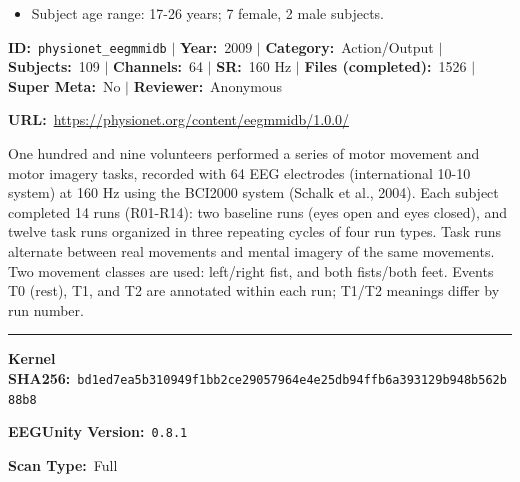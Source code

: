 {\begin{tcolorbox}
\begin{itemize}[leftmargin=1.4em,noitemsep,topsep=2pt]
\item{\footnotesize Subject age range: 17-26 years; 7 female, 2 male subjects.}
\end{itemize}
\end{tcolorbox}
\vspace{3pt}
\noindent\begin{tcolorbox}[breakable,enhanced,colback=white,colframe=gray!55,boxrule=0.9pt,arc=4pt,left=6pt,right=6pt,top=4pt,bottom=4pt,title={\small\bfseries EEG Motor Movement/Imagery Database\hfill \colorbox{gray!20}{\scriptsize\sffamily\bfseries Completed}},coltitle=black,colbacktitle=gray!12,titlerule=0.5pt]
{\footnotesize \textbf{ID:}~\texttt{physionet\_eegmmidb} $\mid$ \textbf{Year:}~2009 $\mid$ \textbf{Category:}~Action/Output $\mid$ \textbf{Subjects:}~109 $\mid$ \textbf{Channels:}~64 $\mid$ \textbf{SR:}~160 Hz $\mid$ \textbf{Files (completed):}~1526 $\mid$ \textbf{Super Meta:}~No $\mid$ \textbf{Reviewer:}~Anonymous}
\par{\footnotesize\textbf{URL:}~\url{https://physionet.org/content/eegmmidb/1.0.0/}}
\tcbline
{}\par\smallskip
{\footnotesize One hundred and nine volunteers performed a series of motor movement and motor imagery tasks, recorded with 64 EEG electrodes (international 10-10 system) at 160 Hz using the BCI2000 system (Schalk et al., 2004). Each subject completed 14 runs (R01-R14): two baseline runs (eyes open and eyes closed), and twelve task runs organized in three repeating cycles of four run types. Task runs alternate between real movements and mental imagery of the same movements. Two movement classes are used: left/right fist, and both fists/both feet. Events T0 (rest), T1, and T2 are annotated within each run; T1/T2 meanings differ by run number.}
\noindent\rule{\linewidth}{0.4pt}\par\nopagebreak
{}\par\smallskip
{\scriptsize
\noindent\textbf{Kernel SHA256:}~\texttt{bd1ed7ea5b310949f1bb2ce29057964e4e25db94ffb6a393129b948b562b88b8}\par\smallskip
\noindent\textbf{EEGUnity Version:}~\texttt{0.8.1}\par\smallskip
\noindent\textbf{Scan Type:}~Full\par\smallskip
}
\smallskip{}\par\smallskip
\begingroup\scriptsize\setlength{\tabcolsep}{2pt}
\begin{tabular}{@{}p{0.1567\linewidth}p{0.1567\linewidth}p{0.0783\linewidth}p{0.0783\linewidth}p{0.4700\linewidth}@{}}

\end{tabular}
\end{tcolorbox}}
